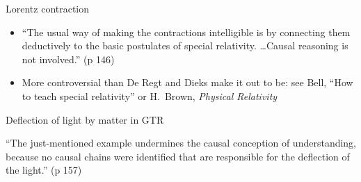 \documentclass[fleqn]{beamer}
\begin{document}
\begin{frame}{Lorentz contraction}

\vspace{-0.3em}
\begin{center}
\end{center}

\vspace{-0.3em}
\small
  \begin{itemize}
  \item ``The usual way of making the contractions intelligible is by
    connecting them deductively to the basic postulates of special
    relativity. \dots Causal reasoning is not involved.'' (p 146)
  \item More controversial than De Regt and Dieks make it out to be:
    see Bell, ``How to teach special relativity'' or H.\ Brown,
    \emph{Physical Relativity}
  \end{itemize}

\end{frame}

\begin{frame}{Deflection of light by matter in GTR}

  ``The just-mentioned example undermines the causal conception of
  understanding, because no causal chains were identified that are
  responsible for the deflection of the light.'' (p 157)

\end{frame}
\end{document}
